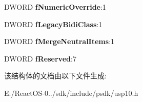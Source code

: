 \begin{DoxyCompactItemize}
\item 
\mbox{\label{structtag___s_c_r_i_p_t___c_o_n_t_r_o_l_a3c253c86428bcecf3ade409344204336}} 
D\+W\+O\+RD {\bfseries f\+Numeric\+Override}\+:1
\item 
\mbox{\label{structtag___s_c_r_i_p_t___c_o_n_t_r_o_l_aade98ed3ff8744d27af7766878ce5300}} 
D\+W\+O\+RD {\bfseries f\+Legacy\+Bidi\+Class}\+:1
\item 
\mbox{\label{structtag___s_c_r_i_p_t___c_o_n_t_r_o_l_af87cb584edc0204e5fd2270b2d116f5c}} 
D\+W\+O\+RD {\bfseries f\+Merge\+Neutral\+Items}\+:1
\item 
\mbox{\label{structtag___s_c_r_i_p_t___c_o_n_t_r_o_l_a405ca2ea149a7d77d0a81df7555451e8}} 
D\+W\+O\+RD {\bfseries f\+Reserved}\+:7
\end{DoxyCompactItemize}


该结构体的文档由以下文件生成\+:\begin{DoxyCompactItemize}
\item 
E\+:/\+React\+O\+S-\/0../sdk/include/psdk/usp10.\+h\end{DoxyCompactItemize}
